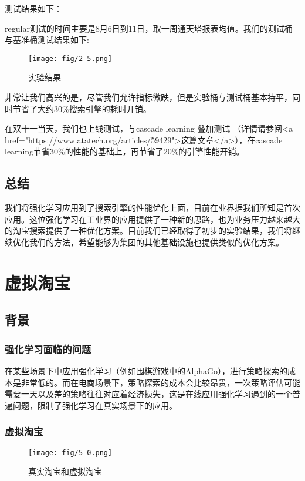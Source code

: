 测试结果如下：

regular测试的时间主要是8月6日到11日，取一周通天塔报表均值。我们的测试桶与基准桶测试结果如下:
\begin{figure}[!h]
\centering
\texttt{[image: fig/2-5.png]}
\caption{实验结果}
\end{figure}

非常让我们高兴的是，尽管我们允许指标微跌，但是实验桶与测试桶基本持平，同时节省了大约30\%搜索引擎的耗时开销。

在双十一当天，我们也上线测试，与cascade learning 叠加测试 （详情请参阅<a href="https://www.atatech.org/articles/59429">这篇文章</a>），在cascade learning节省30\%的性能的基础上，再节省了20\%的引擎性能开销。

\subsection{总结}
我们将强化学习应用到了搜索引擎的性能优化上面，目前在业界据我们所知是首次应用。这位强化学习在工业界的应用提供了一种新的思路，也为业务压力越来越大的淘宝搜索提供了一种优化方案。目前我们已经取得了初步的实验结果，我们将继续优化我们的方法，希望能够为集团的其他基础设施也提供类似的优化方案。
 




\section{虚拟淘宝}
\subsection{背景}
\subsubsection{强化学习面临的问题}
在某些场景下中应用强化学习（例如围棋游戏中的AlphaGo），进行策略探索的成本是非常低的。而在电商场景下，策略探索的成本会比较昂贵，一次策略评估可能需要一天以及差的策略往往对应着经济损失，这是在线应用强化学习遇到的一个普遍问题，限制了强化学习在真实场景下的应用。
\subsubsection{虚拟淘宝}
\begin{figure}[!h]
\centering
\texttt{[image: fig/5-0.png]}
\caption{真实淘宝和虚拟淘宝}
\end{figure}

